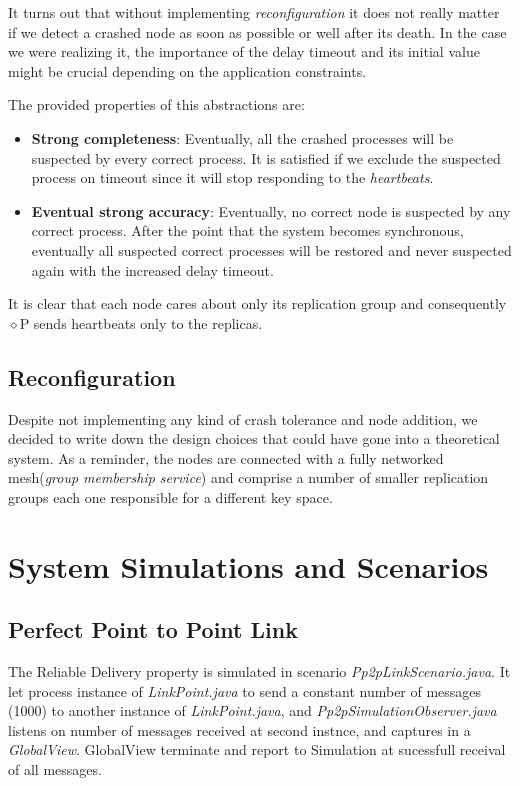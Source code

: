 \documentclass[a4paper, 11pt]{article}
\begin{document}
It turns out that without implementing \textit{reconfiguration} it does not really matter if we detect a crashed node as soon as possible or well after its death. In the case we were realizing it, the importance of the delay timeout and its initial value might be crucial depending on the application constraints.

The provided properties of this abstractions are:
\begin{itemize}
	\item \textbf{Strong completeness}: Eventually, all the crashed processes will be suspected by every correct process. It is satisfied if we exclude the suspected process on timeout since it will stop responding to the \textit{heartbeats}.
	\item \textbf{Eventual strong accuracy}: Eventually, no correct node is suspected by any correct process. After the point that the system becomes synchronous, eventually all suspected correct processes will be restored and never suspected again with the increased delay timeout.
\end{itemize}

It is clear that each node cares about only its replication group and consequently $\diamond$P sends heartbeats only to the replicas. 

\subsection{Reconfiguration}

Despite not implementing any kind of crash tolerance and node addition, we decided to write down the design choices that could have gone into a theoretical system. As a reminder, the nodes are connected with a fully networked mesh(\textit{group membership service}) and comprise a number of smaller replication groups each one responsible for a different key space. \par



\section{System Simulations and Scenarios}

\subsection{Perfect Point to Point Link}

The Reliable Delivery property is simulated in scenario \textit{Pp2pLinkScenario.java}. It let process instance of \textit{LinkPoint.java} to send a constant number of messages (1000) to another instance of \textit{LinkPoint.java}, and \textit{Pp2pSimulationObserver.java} listens on number of messages received at second instnce, and captures in a 
\textit{GlobalView}. GlobalView terminate and report to Simulation at sucessfull receival of all messages.
\end{document}
